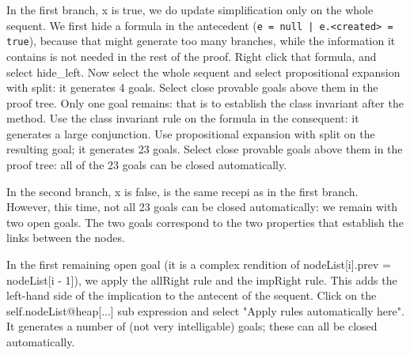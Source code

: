 In the first branch, x is true, we do update simplification only on the whole sequent. We first hide a formula in the antecedent (\texttt{e = null | e.<created> = true}), because that might generate too many branches, while the information it contains is not needed in the rest of the proof. Right click that formula, and select hide\_left. Now select the whole sequent and select propositional expansion with split: it generates 4 goals. Select close provable goals above them in the proof tree. Only one goal remains: that is to establish the class invariant after the method. Use the class invariant rule on the formula in the consequent: it generates a large conjunction. Use propositional expansion with split on the resulting goal; it generates 23 goals. Select close provable goals above them in the proof tree: all of the 23 goals can be closed automatically.

In the second branch, x is false, is the same recepi as in the first branch. However, this time, not all 23 goals can be closed automatically: we remain with two open goals. The two goals correspond to the two properties that establish the links between the nodes.

In the first remaining open goal (it is a complex rendition of nodeList[i].prev = nodeList[i - 1]), we apply the allRight rule and the impRight rule. This adds the left-hand side of the implication to the antecent of the sequent. Click on the self.nodeList@heap[...] sub expression and select "Apply rules automatically here". It generates a number of (not very intelligable) goals; these can all be closed automatically.

